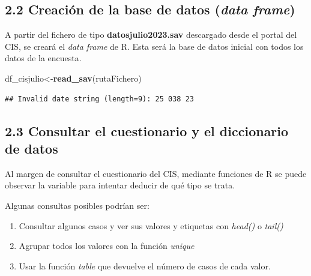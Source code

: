 \documentclass[
  12 pt,
  a4paper,
]{article}
\newenvironment{Shaded}{\begin{snugshade}}{\end{snugshade}}
\newcommand{\FunctionTok}[1]{\textcolor[rgb]{0.13,0.29,0.53}{\textbf{#1}}}
\newcommand{\NormalTok}[1]{#1}
\newcommand{\OtherTok}[1]{\textcolor[rgb]{0.56,0.35,0.01}{#1}}
\providecommand{\tightlist}{%
  \setlength{\itemsep}{0pt}\setlength{\parskip}{0pt}}
\begin{document}
\hypertarget{creaciuxf3n-de-la-base-de-datos-data-frame}{%
\subsection{\texorpdfstring{2.2 Creación de la base de datos (\emph{data
frame})}{2.2 Creación de la base de datos (data frame)}}\label{creaciuxf3n-de-la-base-de-datos-data-frame}}

A partir del fichero de tipo \textbf{datosjulio2023.sav} descargado
desde el portal del CIS, se creará el \emph{data frame} de R. Esta será
la base de datos inicial con todos los datos de la encuesta.

\begin{Shaded}
\begin{Highlighting}[]
\NormalTok{df\_cisjulio}\OtherTok{\textless{}{-}}\FunctionTok{read\_sav}\NormalTok{(rutaFichero)}
\end{Highlighting}
\end{Shaded}

\begin{verbatim}
## Invalid date string (length=9): 25 038 23
\end{verbatim}

\hypertarget{consultar-el-cuestionario-y-el-diccionario-de-datos}{%
\subsection{2.3 Consultar el cuestionario y el diccionario de
datos}\label{consultar-el-cuestionario-y-el-diccionario-de-datos}}

Al margen de consultar el cuestionario del CIS, mediante funciones de R
se puede observar la variable para intentar deducir de qué tipo se
trata.

Algunas consultas posibles podrían ser:

\begin{enumerate}
\def\labelenumi{\arabic{enumi}.}
\tightlist
\item
  Consultar algunos casos y ver sus valores y etiquetas con
  \emph{head()} o \emph{tail()}
\item
  Agrupar todos los valores con la función \emph{unique}
\item
  Usar la función \emph{table} que devuelve el número de casos de cada
  valor.
\end{enumerate}
\end{document}

